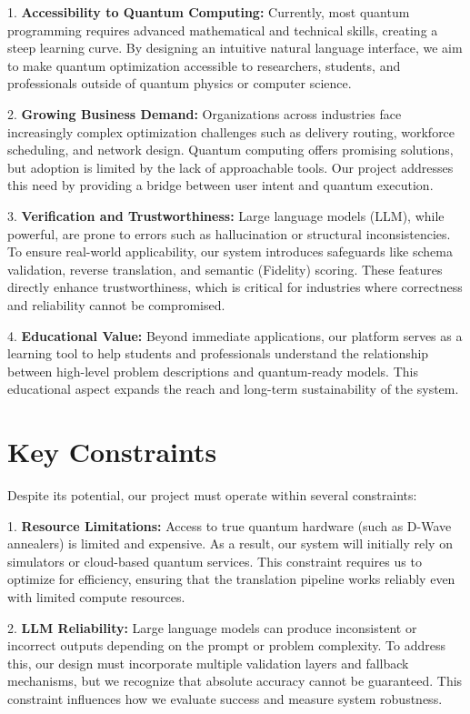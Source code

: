 1. \textbf{Accessibility to Quantum Computing:} Currently, most quantum programming requires advanced mathematical and technical skills, creating a steep learning curve. By designing an intuitive natural language interface, we aim to make quantum optimization accessible to researchers, students, and professionals outside of quantum physics or computer science.  

2. \textbf{Growing Business Demand:} Organizations across industries face increasingly complex optimization challenges such as delivery routing, workforce scheduling, and network design. Quantum computing offers promising solutions, but adoption is limited by the lack of approachable tools. Our project addresses this need by providing a bridge between user intent and quantum execution.  

3. \textbf{Verification and Trustworthiness:} Large language models (\gls{LLM}), while powerful, are prone to errors such as hallucination or structural inconsistencies. To ensure real-world applicability, our system introduces safeguards like schema validation, reverse translation, and semantic (\gls{Fidelity}) scoring. These features directly enhance trustworthiness, which is critical for industries where correctness and reliability cannot be compromised.  

4. \textbf{Educational Value:} Beyond immediate applications, our platform serves as a learning tool to help students and professionals understand the relationship between high-level problem descriptions and quantum-ready models. This educational aspect expands the reach and long-term sustainability of the system.  


\section*{Key Constraints}
Despite its potential, our project must operate within several constraints:  

1. \textbf{Resource Limitations:} Access to true quantum hardware (such as D-Wave annealers) is limited and expensive. As a result, our system will initially rely on simulators or cloud-based quantum services. This constraint requires us to optimize for efficiency, ensuring that the translation pipeline works reliably even with limited compute resources.  

2. \textbf{LLM Reliability:} Large language models can produce inconsistent or incorrect outputs depending on the prompt or problem complexity. To address this, our design must incorporate multiple validation layers and fallback mechanisms, but we recognize that absolute accuracy cannot be guaranteed. This constraint influences how we evaluate success and measure system robustness.  

